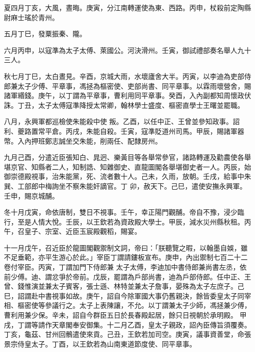 \begin{pinyinscope}
 夏四月丁亥，大風，晝晦。庚寅，分江南轉運使為東、西路。丙申，杖殺前定陶縣尉麻士瑤於青州。



 五月丁巳，發粟振秦、隴。



 六月丙申，以寇準為太子太傅、萊國公。河決滑州。壬寅，御試禮部奏名舉人九十三人。



 秋七月丁巳，太白晝見。辛酉，京城大雨，水壞廬舍大半。丙寅，以李迪為吏部侍郎兼太子少傅、平章事，馮拯為樞密使、吏部尚書、同平章事。以霖雨壞營舍，賜諸軍緡錢。庚午，以丁謂為平章事，曹利用同平章事。癸酉，入內副都知周懷政伏誅。丁丑，太子太傅寇準降授太常卿，翰林學士盛度、樞密直學士王曙並罷職。



 八月，永興軍都巡檢使朱能殺中使
 叛。乙酉，以任中正、王曾並參知政事。詔利、夔路置常平倉。丙戌，朱能自殺。壬寅，寇準貶道州司馬。甲辰，賜諸軍器幣。入內押班鄭志誠坐交朱能，削兩任、配隸房州。



 九月己酉，分遣近臣張知白、晁迥、樂黃目等各舉常參官，諸路轉運及勸農使各舉堪京官、知縣者二人，知制誥、知雜御史、直龍圖閣各舉堪御史者一人。丙辰，始御崇德殿視事，治朱能黨，死、流者數十人。己未，久雨，放朝。壬戌，給事中朱巽、工部郎中梅詢坐不察朱能奸謫官。丁
 卯，赦天下。己巳，遣使安撫永興軍。壬申，賜京城酺。



 冬十月戊寅，命依唐制，雙日不視事。壬午，幸正陽門觀酺。帝自不豫，浸少臨行，至是人情大悅。壬辰，以王欽若為資政殿大學士。甲辰，減水災州縣秋租。丙午，召皇子、宗室、近臣玉宸殿觀稻，賜宴。



 十一月戊午，召近臣於龍圖閣觀禦制文詞，帝曰：「朕聽覽之暇，以翰墨自娛，雖不足垂範，亦平生游心於此。」宰臣丁謂請鏤板宣布。庚申，內出禦制七百二十二卷付宰臣。丙寅，丁謂加門下侍郎兼
 太子太傅，李迪加中書侍郎兼尚書左丞，依前少傅。迪、謂忿爭於帝前。戊辰，罷謂為戶部尚書，迪為戶部侍郎。任中正、王曾、錢惟演並兼太子賓客，張士遜、林特並兼太子詹事，晏殊為太子左庶子。己巳，詔謂赴中書視事如故。庚午，詔自今除軍國大事仍舊親決，餘皆委皇太子同宰相、樞密使等參議行之。太子上表陳讓，不允。以丁謂兼太子少師，馮拯兼少傅，曹利用兼少保。辛未，詔自今群臣五日於長春殿起居，餘只日視朝於承明殿。
 甲戌，丁謂等請作天章閣奉安御集。十二月乙酉，皇太子親政，詔內臣傳旨須覆奏。丁亥，龜茲、甘州回鶻遣使來貢。己丑，王欽若加司空。庚寅，議事資善堂，命張景宗侍皇太子。丁酉，以王欽若為山南東道節度使、同平章事。




\end{pinyinscope}
